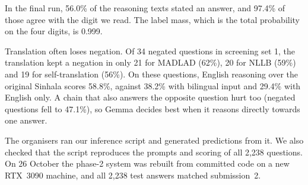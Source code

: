  In the final run, 56.0\% of the reasoning texts stated an answer, and 97.4\% of those agree with the digit we read. The label mass, which is the total probability on the four digits, is 0.999.

 Translation often loses negation. Of 34 negated questions in screening set 1, the translation kept a negation in only 21 for MADLAD (62\%), 20 for NLLB (59\%) and 19 for self-translation (56\%). On these questions, English reasoning over the original Sinhala scores 58.8\%, against 38.2\% with bilingual input and 29.4\% with English only. A chain that also answers the opposite question hurt too (negated questions fell to 47.1\%), so Gemma decides best when it reasons directly towards one answer.

 The organisers ran our inference script and generated predictions from it. We also checked that the script reproduces the prompts and scoring of all 2,238 questions. On 26 October the phase-2 system was rebuilt from committed code on a new RTX~3090 machine, and all 2,238 test answers matched submission~2.

\clearpage
